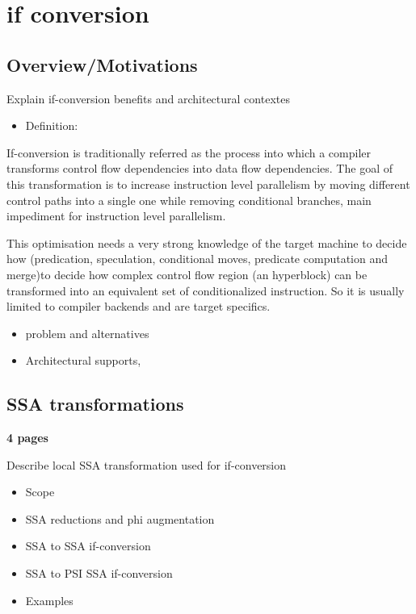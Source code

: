 \chapter{if conversion }

\section{Overview/Motivations}

Explain if-conversion benefits and architectural contextes

    \begin{itemize}
    \item Definition:
    \end{itemize}
If-conversion is traditionally referred as the process into which a compiler transforms control flow dependencies into data flow dependencies. The goal of this transformation is to increase instruction level parallelism by moving different control paths into a single one while removing conditional branches, main impediment for instruction level parallelism.

This optimisation needs a very strong knowledge of the target machine to decide how (predication, speculation, conditional moves, predicate computation and merge)to decide how complex control flow region (an hyperblock) can be transformed into an equivalent set of conditionalized instruction. So it is usually limited to compiler backends and are target specifics.

    \begin{itemize}
    \item problem and alternatives
    \item Architectural supports, 
    \end{itemize}

\section{SSA transformations}

\textbf{4 pages}

Describe local SSA transformation used for if-conversion

    \begin{itemize}

    \item Scope

    \item SSA reductions and phi augmentation

    \item SSA to SSA if-conversion

    \item SSA to PSI SSA if-conversion

    \item Examples

    \end{itemize}

